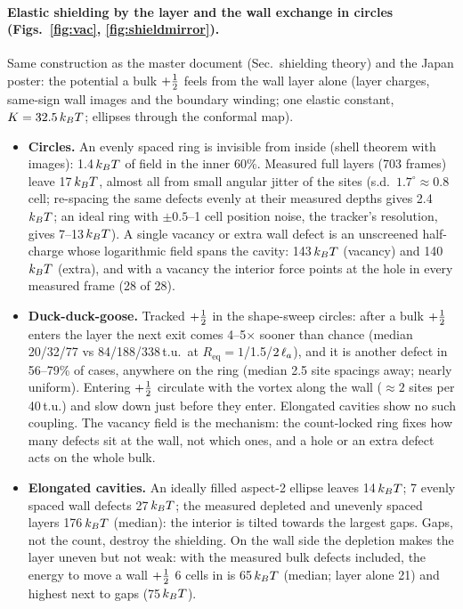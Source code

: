 \paragraph{Elastic shielding by the layer and the wall exchange in circles (Figs.~\ref{fig:vac}, \ref{fig:shieldmirror}).} Same construction as the master document
(Sec.\ shielding theory) and the Japan poster: the potential a bulk $+\tfrac12$ feels from the wall layer alone (layer charges, same-sign wall images and the boundary winding;
one elastic constant, $K=32.5\,k_BT$; ellipses through the conformal map).
\begin{itemize}
  \item \textbf{Circles.} An evenly spaced ring is invisible from inside (shell theorem with images): 1.4\,$k_BT$ of field in the inner 60\%. Measured full layers (703 frames) leave 17\,$k_BT$,
        almost all from small angular jitter of the sites (s.d.\ $1.7^\circ\approx0.8$ cell; re-spacing the same defects evenly at their measured depths gives 2.4\,$k_BT$; an ideal ring with
        $\pm0.5$--1 cell position noise, the tracker's resolution, gives 7--13\,$k_BT$). A single vacancy or extra wall defect is an unscreened half-charge whose logarithmic field spans
        the cavity: 143\,$k_BT$ (vacancy) and 140\,$k_BT$ (extra), and with a vacancy the interior force points at the hole in every measured frame (28 of 28).
  \item \textbf{Duck-duck-goose.} Tracked $+\tfrac12$ in the shape-sweep circles: after a bulk $+\tfrac12$ enters the layer the next exit comes 4--5$\times$ sooner than chance
        (median 20/32/77 vs 84/188/338\,t.u.\ at $R_\mathrm{eq}=1$/1.5/$2\,\ell_a$), and it is another defect in 56--79\% of cases, anywhere on the ring (median 2.5 site spacings away; nearly
        uniform). Entering $+\tfrac12$ circulate with the vortex along the wall ($\approx2$ sites per 40\,t.u.) and slow down just before they enter. Elongated cavities show no such coupling.
        The vacancy field is the mechanism: the count-locked ring fixes how many defects sit at the wall, not which ones, and a hole or an extra defect acts on the whole bulk.
  \item \textbf{Elongated cavities.} An ideally filled aspect-2 ellipse leaves 14\,$k_BT$; 7 evenly spaced wall defects 27\,$k_BT$; the measured depleted and unevenly spaced layers
        176\,$k_BT$ (median): the interior is tilted towards the largest gaps. Gaps, not the count, destroy the shielding. On the wall side the depletion makes the layer uneven but not weak:
        with the measured bulk defects included, the energy to move a wall $+\tfrac12$ 6 cells in is 65\,$k_BT$ (median; layer alone 21) and highest next to gaps (75\,$k_BT$).

\end{itemize}
